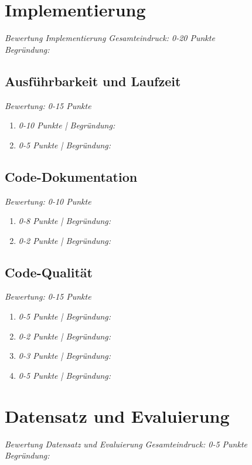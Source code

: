 \documentclass[deutsch, paper=a4]{scrartcl}
\begin{document}
\section{Implementierung}
\textit{Bewertung Implementierung Gesamteindruck: 0-20 Punkte\\ 
Begründung: }
\subsection{Ausführbarkeit und Laufzeit}
\textit{Bewertung: 0-15 Punkte}\\
\begin{enumerate}[label=\alph*)]
\item \textit{0-10 Punkte | Begründung: }
\item \textit{0-5 Punkte | Begründung: }
\end{enumerate}

\subsection{Code-Dokumentation}
\textit{Bewertung: 0-10 Punkte}\\
\begin{enumerate}[label=\alph*)]
\item \textit{0-8 Punkte | Begründung: }
\item \textit{0-2 Punkte | Begründung: }
\end{enumerate}

\subsection{Code-Qualität}
\textit{Bewertung: 0-15 Punkte}\\
\begin{enumerate}[label=\alph*)]
\item \textit{0-5 Punkte | Begründung: }
\item \textit{0-2 Punkte | Begründung: }
\item \textit{0-3 Punkte | Begründung: }
\item \textit{0-5 Punkte | Begründung: }
\end{enumerate}

\section{Datensatz und Evaluierung}
\textit{Bewertung Datensatz und Evaluierung Gesamteindruck: 0-5 Punkte\\ 
Begründung: }
\end{document}
